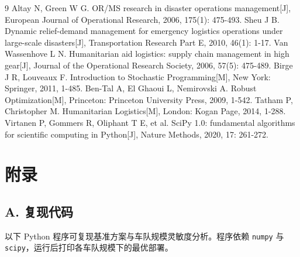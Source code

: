 \documentclass[12pt,a4paper,fontset=windows]{ctexart}
\begin{document}
\begin{thebibliography}{9}
 Altay N, Green W G. OR/MS research in disaster operations management[J], European Journal of Operational Research, 2006, 175(1): 475-493.
 Sheu J B. Dynamic relief-demand management for emergency logistics operations under large-scale disasters[J], Transportation Research Part E, 2010, 46(1): 1-17.
 Van Wassenhove L N. Humanitarian aid logistics: supply chain management in high gear[J], Journal of the Operational Research Society, 2006, 57(5): 475-489.
 Birge J R, Louveaux F. Introduction to Stochastic Programming[M], New York: Springer, 2011, 1-485.
 Ben-Tal A, El Ghaoui L, Nemirovski A. Robust Optimization[M], Princeton: Princeton University Press, 2009, 1-542.
 Tatham P, Christopher M. Humanitarian Logistics[M], London: Kogan Page, 2014, 1-288.
 Virtanen P, Gommers R, Oliphant T E, et al. SciPy 1.0: fundamental algorithms for scientific computing in Python[J], Nature Methods, 2020, 17: 261-272.
\end{thebibliography}

\clearpage
\section*{附录}

\subsection*{A. 复现代码}

以下 Python 程序可复现基准方案与车队规模灵敏度分析。程序依赖 \texttt{numpy} 与 \texttt{scipy}，运行后打印各车队规模下的最优部署。
\end{document}
